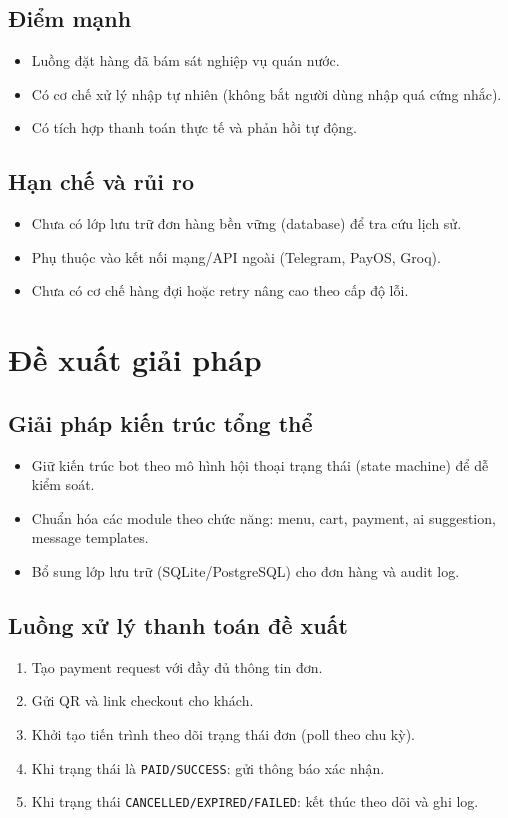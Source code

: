 \documentclass[12pt,a4paper]{article}
\begin{document}
\subsection{Điểm mạnh}
\begin{itemize}
    \item Luồng đặt hàng đã bám sát nghiệp vụ quán nước.
    \item Có cơ chế xử lý nhập tự nhiên (không bắt người dùng nhập quá cứng nhắc).
    \item Có tích hợp thanh toán thực tế và phản hồi tự động.
\end{itemize}

\subsection{Hạn chế và rủi ro}
\begin{itemize}
    \item Chưa có lớp lưu trữ đơn hàng bền vững (database) để tra cứu lịch sử.
    \item Phụ thuộc vào kết nối mạng/API ngoài (Telegram, PayOS, Groq).
    \item Chưa có cơ chế hàng đợi hoặc retry nâng cao theo cấp độ lỗi.
\end{itemize}

\section{Đề xuất giải pháp}
\subsection{Giải pháp kiến trúc tổng thể}
\begin{itemize}
    \item Giữ kiến trúc bot theo mô hình hội thoại trạng thái (state machine) để dễ kiểm soát.
    \item Chuẩn hóa các module theo chức năng: menu, cart, payment, ai suggestion, message templates.
    \item Bổ sung lớp lưu trữ (SQLite/PostgreSQL) cho đơn hàng và audit log.
\end{itemize}

\subsection{Luồng xử lý thanh toán đề xuất}
\begin{enumerate}
    \item Tạo payment request với đầy đủ thông tin đơn.
    \item Gửi QR và link checkout cho khách.
    \item Khởi tạo tiến trình theo dõi trạng thái đơn (poll theo chu kỳ).
    \item Khi trạng thái là \texttt{PAID/SUCCESS}: gửi thông báo xác nhận.
    \item Khi trạng thái \texttt{CANCELLED/EXPIRED/FAILED}: kết thúc theo dõi và ghi log.
\end{enumerate}
\end{document}
